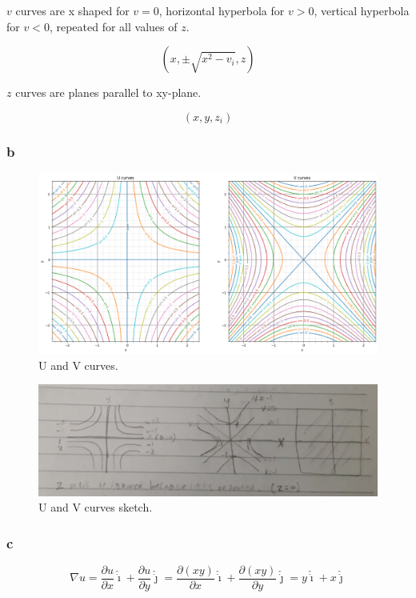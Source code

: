 \documentclass[12pt]{article}
\begin{document}
\(v\) curves are x shaped for \(v=0\), horizontal hyperbola for \(v>0\), vertical hyperbola for
\(v<0\), repeated for all values of \(z\).

\[
    (x, \pm\sqrt{x^2 - v_i}, z)
\]

\(z\) curves are planes parallel to xy-plane.


\[
    (x, y, z_i)
\]

\subsubsection{b}

\begin{figure}[H]
    \includegraphics[width=\linewidth]{Q1B.png}
    \caption{U and V curves.}\label{fig:Q1B}
\end{figure}

\begin{figure}[H]
    \includegraphics[width=\linewidth]{Q1B.jpg}
    \caption{U and V curves sketch.}\label{fig:Q1B2}
\end{figure}

\subsubsection{c}

\[
    \nabla u = \frac{ \partial u}{\partial x} \hat{\dot{\imath}}
    + \frac{ \partial u}{\partial y}  \hat{\dot{\jmath}} = \frac{ \partial (xy)}{\partial x}  \hat{\dot{\imath}}
    + \frac{ \partial (xy)}{\partial y}  \hat{\dot{\jmath}} = y  \hat{\dot{\imath}}
    + x  \hat{\dot{\jmath}}
\]
\end{document}
